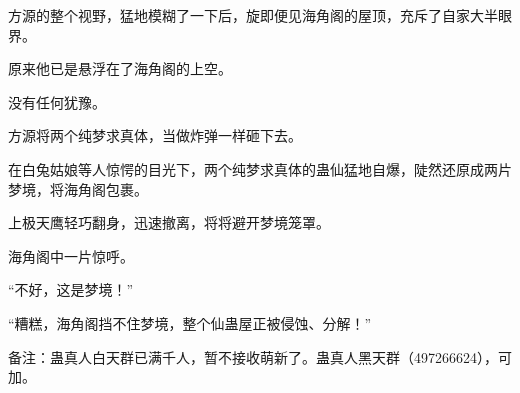 \begin{this_body}
方源的整个视野，猛地模糊了一下后，旋即便见海角阁的屋顶，充斥了自家大半眼界。

原来他已是悬浮在了海角阁的上空。

没有任何犹豫。

方源将两个纯梦求真体，当做炸弹一样砸下去。

在白兔姑娘等人惊愕的目光下，两个纯梦求真体的蛊仙猛地自爆，陡然还原成两片梦境，将海角阁包裹。

上极天鹰轻巧翻身，迅速撤离，将将避开梦境笼罩。

海角阁中一片惊呼。

“不好，这是梦境！”

“糟糕，海角阁挡不住梦境，整个仙蛊屋正被侵蚀、分解！”

备注：蛊真人白天群已满千人，暂不接收萌新了。蛊真人黑天群（497266624），可加。

\end{this_body}

